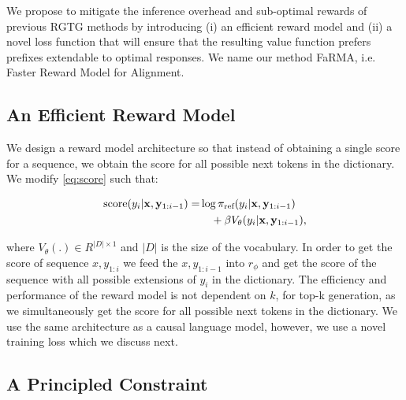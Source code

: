 
We propose to mitigate the inference overhead and sub-optimal rewards of previous RGTG methods by introducing (i) an efficient reward model and (ii) a novel loss function that will ensure that the resulting value function prefers prefixes extendable to optimal responses.  We name our method FaRMA, i.e. Faster Reward Model for Alignment.

\subsection{An Efficient Reward Model}

We design a reward model architecture so that instead of obtaining a single score for a sequence, we obtain the score for all possible next tokens in the dictionary. We modify \eqref{eq:score} such that:

\begin{equation}
  \label{eq:score-new}
  \begin{aligned}
  \textstyle
  \mathrm{score}(y_{i} | \mathbf{x}, \mathbf{y}_{1:i-1}) = &\log \pi_\text{ref}(y_{i} \vert \mathbf{x}, \mathbf{y}_{1:i-1}) \\ 
    &\quad + \beta V_\theta(y_{i} \vert \mathbf{x}, \mathbf{y}_{1:i-1}) ,
  \end{aligned}
\end{equation}

where $V_\theta(.) \in R^{|D|\times 1}$ and $|D|$ is the size of the vocabulary.
In order to get the score of sequence $x,y_{1:i}$ we feed the $x,y_{1:i-1}$ into $r_\phi$ and get the score of the sequence with all possible extensions of $y_i$ in the dictionary. 
The efficiency and performance of the reward model is not dependent on $k$, for top-k generation, as we simultaneously get the score for all possible next tokens in the dictionary. We use the same architecture as a causal language model, however, we use a novel training loss which we discuss next. 




\subsection{A Principled Constraint}

